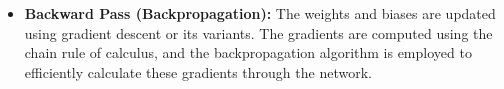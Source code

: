 \begin{itemize}
\begin{itemize}
\end{itemize}

  
\item {\textbf{Backward Pass (Backpropagation):}}
The weights and biases are updated using gradient descent or its variants. The gradients are computed using the chain rule of calculus, and the backpropagation algorithm is employed to efficiently calculate these gradients through the network.
\end{itemize}


